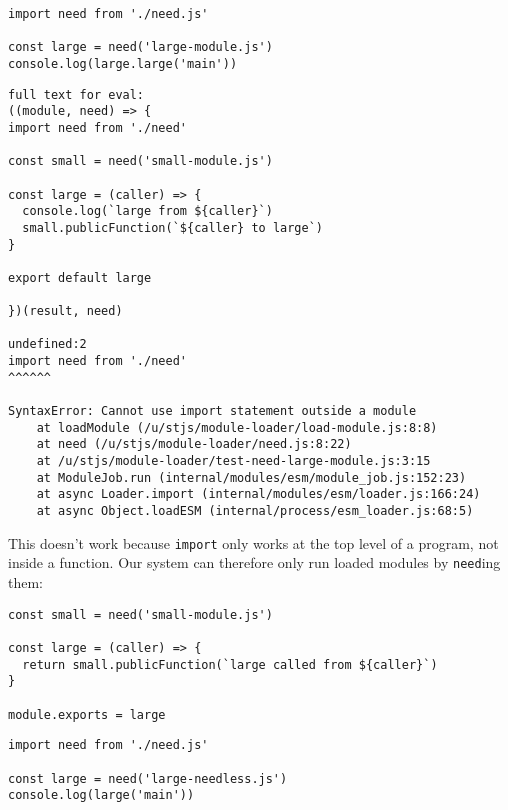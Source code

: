 \documentclass[krantzl]{krantz}
\begin{document}
\begin{lstlisting}[frame=tblr]
import need from './need.js'

const large = need('large-module.js')
console.log(large.large('main'))
\end{lstlisting}



\begin{lstlisting}[frame=tblr,backgroundcolor=\color{black!5}]
full text for eval:
((module, need) => {
import need from './need'

const small = need('small-module.js')

const large = (caller) => {
  console.log(`large from ${caller}`)
  small.publicFunction(`${caller} to large`)
}

export default large

})(result, need)

undefined:2
import need from './need'
^^^^^^

SyntaxError: Cannot use import statement outside a module
    at loadModule (/u/stjs/module-loader/load-module.js:8:8)
    at need (/u/stjs/module-loader/need.js:8:22)
    at /u/stjs/module-loader/test-need-large-module.js:3:15
    at ModuleJob.run (internal/modules/esm/module_job.js:152:23)
    at async Loader.import (internal/modules/esm/loader.js:166:24)
    at async Object.loadESM (internal/process/esm_loader.js:68:5)
\end{lstlisting}



This doesn’t work because \texttt{import} only works at the top level of a program,
not inside a function.
Our system can therefore only run loaded modules by \texttt{need}ing them:


\begin{lstlisting}[frame=tblr]
const small = need('small-module.js')

const large = (caller) => {
  return small.publicFunction(`large called from ${caller}`)
}

module.exports = large
\end{lstlisting}



\begin{lstlisting}[frame=tblr]
import need from './need.js'

const large = need('large-needless.js')
console.log(large('main'))
\end{lstlisting}
\end{document}
